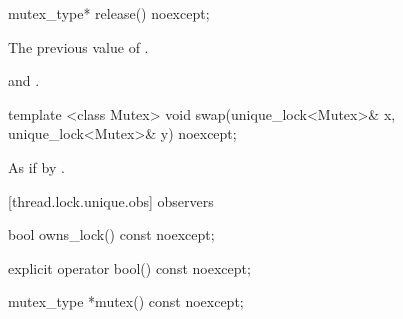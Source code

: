 %
%
\begin{itemdecl}
mutex_type* release() noexcept;
\end{itemdecl}

\begin{itemdescr}
\pnum\returns The previous value of .

\pnum\postconditions {} and .
\end{itemdescr}

%
%
\begin{itemdecl}
template <class Mutex>
  void swap(unique_lock<Mutex>& x, unique_lock<Mutex>& y) noexcept;
\end{itemdecl}

\begin{itemdescr}
\pnum\effects As if by .
\end{itemdescr}

[thread.lock.unique.obs]{ observers}

%
%
\begin{itemdecl}
bool owns_lock() const noexcept;
\end{itemdecl}

\begin{itemdescr}
\pnum\returns {}
\end{itemdescr}

%
%
\begin{itemdecl}
explicit operator bool() const noexcept;
\end{itemdecl}

\begin{itemdescr}
\pnum\returns {}
\end{itemdescr}

%
%
\begin{itemdecl}
mutex_type *mutex() const noexcept;
\end{itemdecl}

\begin{itemdescr}
\pnum\returns {}
\end{itemdescr}

